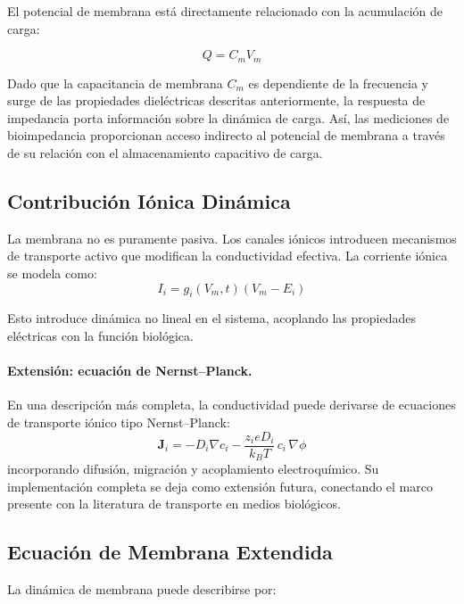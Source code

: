 \documentclass[12pt]{article}
\begin{document}
El potencial de membrana est\'a directamente relacionado con la acumulaci\'on de carga:

\begin{equation}
Q = C_m V_m
\end{equation}

Dado que la capacitancia de membrana $C_m$ es dependiente de la frecuencia y surge de las
propiedades diel\'ectricas descritas anteriormente, la respuesta de impedancia porta
informaci\'on sobre la din\'amica de carga. As\'i, las mediciones de bioimpedancia proporcionan
acceso indirecto al potencial de membrana a trav\'es de su relaci\'on con el almacenamiento
capacitivo de carga.

\subsection{Contribuci\'on I\'onica Din\'amica}

La membrana no es puramente pasiva. Los canales i\'onicos introducen mecanismos de transporte
activo que modifican la conductividad efectiva. La corriente i\'onica se modela como:
\begin{equation}
I_i = g_i(V_m, t)(V_m - E_i)
\end{equation}

Esto introduce din\'amica no lineal en el sistema, acoplando las propiedades el\'ectricas con
la funci\'on biol\'ogica.

\paragraph{Extensi\'on: ecuaci\'on de Nernst--Planck.}
En una descripci\'on m\'as completa, la conductividad puede
derivarse de ecuaciones de transporte i\'onico
tipo Nernst--Planck:
\begin{equation}
\mathbf{J}_i = -D_i \nabla c_i
- \frac{z_i e D_i}{k_B T}\, c_i \,\nabla \phi
\end{equation}
incorporando difusi\'on, migraci\'on y acoplamiento
electroqu\'imico. Su implementaci\'on completa se deja como
extensi\'on futura, conectando el marco presente con
la literatura de transporte en medios biol\'ogicos.

\subsection{Ecuaci\'on de Membrana Extendida}

La din\'amica de membrana puede describirse por:
\end{document}
